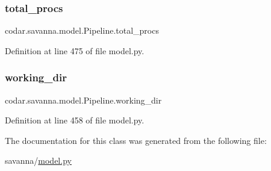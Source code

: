 \subsubsection{\texorpdfstring{total\+\_\+procs}{total\_procs}}
{\footnotesize\ttfamily codar.\+savanna.\+model.\+Pipeline.\+total\+\_\+procs}



Definition at line 475 of file model.\+py.

\mbox{\label{classcodar_1_1savanna_1_1model_1_1_pipeline_a2272c691cd2ecb1b11b581341cd5707c}} 
\subsubsection{\texorpdfstring{working\+\_\+dir}{working\_dir}}
{\footnotesize\ttfamily codar.\+savanna.\+model.\+Pipeline.\+working\+\_\+dir}



Definition at line 458 of file model.\+py.



The documentation for this class was generated from the following file\+:\begin{DoxyCompactItemize}
\item 
savanna/\hyperlink{savanna_2model_8py}{model.\+py}\end{DoxyCompactItemize}
